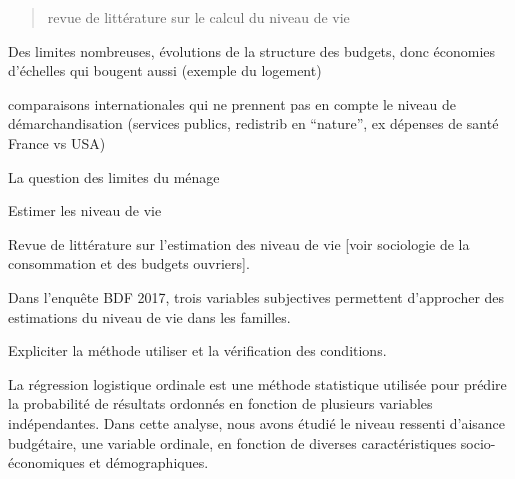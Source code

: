 \documentclass[
  12pt,
]{book}
\begin{document}
\begin{quote}
revue de littérature sur le calcul du niveau de vie
\end{quote}

Des limites nombreuses, évolutions de la structure des budgets, donc
économies d'échelles qui bougent aussi (exemple du logement)

comparaisons internationales qui ne prennent pas en compte le niveau de
démarchandisation (services publics, redistrib en ``nature'', ex
dépenses de santé France vs USA)

La question des limites du ménage

\begin{encadre}{Estimer les niveau de vie}

Revue de littérature sur l'estimation des niveau de vie [voir sociologie de la consommation et des budgets ouvriers].

Dans l'enquête BDF 2017, trois variables subjectives permettent d'approcher des estimations du niveau de vie dans les familles.

\end{encadre}

Expliciter la méthode utiliser et la vérification des conditions.

La régression logistique ordinale est une méthode statistique utilisée
pour prédire la probabilité de résultats ordonnés en fonction de
plusieurs variables indépendantes. Dans cette analyse, nous avons étudié
le niveau ressenti d'aisance budgétaire, une variable ordinale, en
fonction de diverses caractéristiques socio-économiques et
démographiques.
\end{document}
